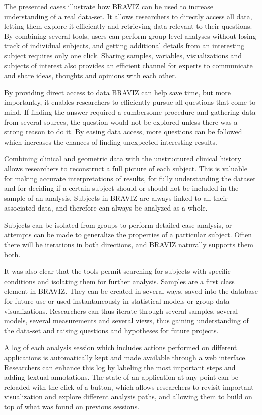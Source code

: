 \documentclass[twocolumn]{svjour3}
\begin{document}
The presented cases illustrate how BRAVIZ can be used to increase understanding of a real data-set. 
It allows researchers to directly access all data, letting them explore it efficiently and retrieving data relevant to their questions. By combining several tools, users can perform group level analyses without losing track of individual subjects, and getting additional details from an interesting subject requires only one click. Sharing samples, variables, visualizations and subjects of interest also provides an efficient channel for experts to communicate and share ideas, thoughts and opinions with each other.

By providing direct access to  data BRAVIZ can help save time, but more importantly, it enables researchers to efficiently pursue all questions that come to mind. If finding the answer required a cumbersome procedure and gathering data from several sources, the question would not be explored unless there was a strong reason to do it. By easing data access, more questions can be followed which increases the chances of finding unexpected interesting results.

Combining clinical and geometric data with the unstructured clinical history allows researchers to reconstruct a full picture of each subject. This is valuable for making accurate interpretations of results, for fully understanding the dataset and for deciding if a certain subject should or should not be included in the sample of an analysis. Subjects in BRAVIZ are always linked to all their associated data, and therefore can always be analyzed as a whole.

Subjects can be isolated from groups to perform detailed case analysis, or attempts can be made to generalize the properties of a particular subject. Often there will be iterations in both directions, and BRAVIZ naturally supports them both.

It was also clear that the tools permit searching for subjects with specific conditions and isolating them for further analysis.
Samples are a first class element in BRAVIZ. They can be created in several ways, saved into the database for future use or used instantaneously in statistical models or group data visualizations. Researchers can thus iterate through several samples, several models, several measurements and several views, thus gaining understanding of the data-set and raising questions and hypotheses for future projects.

A log of each analysis session which includes actions performed on different applications is automatically kept and made available through a web interface. Researchers can enhance this log by labeling the most important steps and adding textual annotations. The state of an application at any point can be reloaded with the click of a button, which allows researchers to revisit important visualization and explore different analysis paths, and allowing them to build on top of what was found on previous sessions. 
\end{document}
